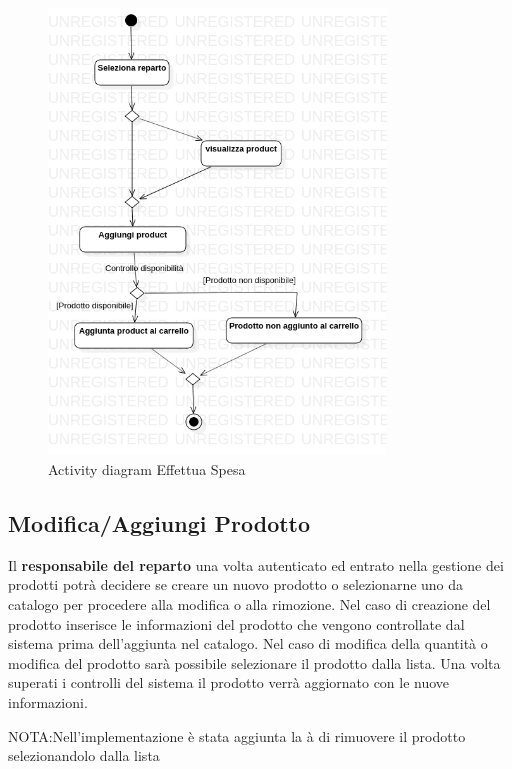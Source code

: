 \documentclass[12pt, a4paper]{report}
\begin{document}
\begin{figure}[h]
  \centering
  \includegraphics[width=0.8\textwidth]{Use Case Model!Effettua spesa!ActivityeffettuaSpesa!ActivityDiagramEffettuaSpesa_4.png}
  \caption{Activity diagram Effettua Spesa}
\end{figure}

\newpage

\subsection{Modifica/Aggiungi Prodotto}

Il \textbf{responsabile del reparto } una volta autenticato ed entrato nella 
gestione dei prodotti potrà decidere se creare un nuovo prodotto o selezionarne
uno da catalogo per procedere alla modifica o alla rimozione.  Nel caso di 
creazione del prodotto inserisce le informazioni del prodotto che vengono 
controllate dal sistema prima dell'aggiunta nel catalogo. Nel caso di modifica
della quantità o modifica del prodotto sarà possibile selezionare il prodotto
dalla lista. Una volta superati i controlli del sistema il prodotto  verrà 
aggiornato con le nuove informazioni.

NOTA:\@ Nell'implementazione è stata aggiunta la à di rimuovere il prodotto 
selezionandolo dalla lista
\end{document}
